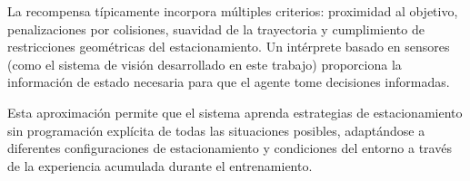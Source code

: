 La recompensa típicamente incorpora múltiples criterios: proximidad al objetivo, penalizaciones por colisiones,
suavidad de la trayectoria y cumplimiento de restricciones geométricas del estacionamiento.
Un intérprete basado en sensores (como el sistema de visión desarrollado en este trabajo) proporciona
la información de estado necesaria para que el agente tome decisiones informadas.


Esta aproximación permite que el sistema aprenda estrategias de estacionamiento sin programación explícita
de todas las situaciones posibles, adaptándose a diferentes configuraciones de estacionamiento y
condiciones del entorno a través de la experiencia acumulada durante el entrenamiento.
